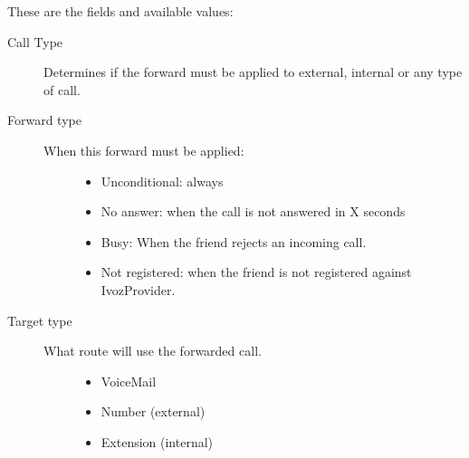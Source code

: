 \documentclass[letterpaper,10pt,english]{sphinxmanual}
\begin{document}
These are the fields and available values:
\begin{description}
\item[{Call Type}] \leavevmode{}\label{administration_portal/client/vpbx/routing_endpoints/friends/index:term-call-type}
Determines if the forward must be applied to external, internal or any
type of call.

\item[{Forward type}] \leavevmode{}\label{administration_portal/client/vpbx/routing_endpoints/friends/index:term-forward-type}\begin{description}
\item[{When this forward must be applied:}] \leavevmode\begin{itemize}
\item {} 
Unconditional: always

\item {} 
No answer: when the call is not answered in X seconds

\item {} 
Busy: When the friend rejects an incoming call.

\item {} 
Not registered: when the friend is not registered against IvozProvider.

\end{itemize}

\end{description}

\item[{Target type}] \leavevmode{}\label{administration_portal/client/vpbx/routing_endpoints/friends/index:term-target-type}\begin{description}
\item[{What route will use the forwarded call.}] \leavevmode\begin{itemize}
\item {} 
VoiceMail

\item {} 
Number (external)

\item {} 
Extension (internal)

\end{itemize}

\end{description}

\end{description}
\end{document}
